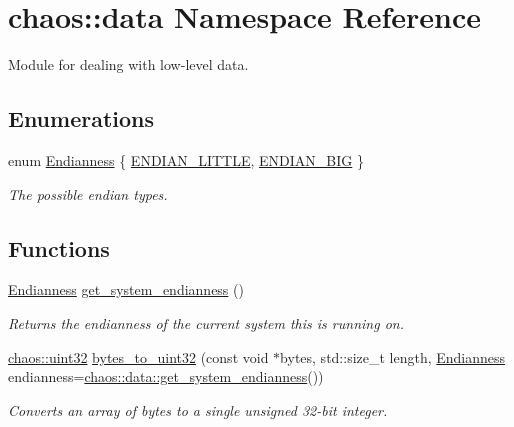 \hypertarget{namespacechaos_1_1data}{\section{chaos\-:\-:data Namespace Reference}
\label{namespacechaos_1_1data}
}


Module for dealing with low-\/level data.  


\subsection*{Enumerations}
\begin{DoxyCompactItemize}
\item 
enum \hyperlink{namespacechaos_1_1data_adb2657d50c0b84cdc1153001031bbf3f}{Endianness} \{ \hyperlink{namespacechaos_1_1data_adb2657d50c0b84cdc1153001031bbf3fa7fc5455bb6147c278dfa4a84e255c66d}{E\-N\-D\-I\-A\-N\-\_\-\-L\-I\-T\-T\-L\-E}, 
\hyperlink{namespacechaos_1_1data_adb2657d50c0b84cdc1153001031bbf3fa0e1ed99b965cedefe24534be309738ad}{E\-N\-D\-I\-A\-N\-\_\-\-B\-I\-G}
 \}
\begin{DoxyCompactList}\small\item\em The possible endian types. \end{DoxyCompactList}\end{DoxyCompactItemize}
\subsection*{Functions}
\begin{DoxyCompactItemize}
\item 
\hypertarget{namespacechaos_1_1data_a853118d28d026784faad6673bbcf526f}{\hyperlink{namespacechaos_1_1data_adb2657d50c0b84cdc1153001031bbf3f}{Endianness} \hyperlink{namespacechaos_1_1data_a853118d28d026784faad6673bbcf526f}{get\-\_\-system\-\_\-endianness} ()}\label{namespacechaos_1_1data_a853118d28d026784faad6673bbcf526f}

\begin{DoxyCompactList}\small\item\em Returns the endianness of the current system this is running on. \end{DoxyCompactList}\item 
\hyperlink{namespacechaos_a8641b3ae4551f0b35570d4f9f4ec22d9}{chaos\-::uint32} \hyperlink{namespacechaos_1_1data_af4310ad815f14c278c83c5abb3abc251}{bytes\-\_\-to\-\_\-uint32} (const void $\ast$bytes, std\-::size\-\_\-t length, \hyperlink{namespacechaos_1_1data_adb2657d50c0b84cdc1153001031bbf3f}{Endianness} endianness=\hyperlink{namespacechaos_1_1data_a853118d28d026784faad6673bbcf526f}{chaos\-::data\-::get\-\_\-system\-\_\-endianness}())
\begin{DoxyCompactList}\small\item\em Converts an array of bytes to a single unsigned 32-\/bit integer. \end{DoxyCompactList}\end{DoxyCompactItemize}


